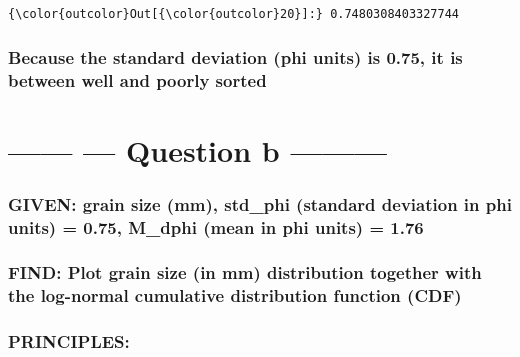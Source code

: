 \documentclass[11pt]{article}
\begin{document}
\begin{Verbatim}[commandchars=\\\{\}]
{\color{outcolor}Out[{\color{outcolor}20}]:} 0.7480308403327744
\end{Verbatim}
            
    \hypertarget{because-the-standard-deviation-phi-units-is-0.75-it-is-between-well-and-poorly-sorted}{%
\subsubsection{Because the standard deviation (phi units) is 0.75, it is
between well and poorly
sorted}\label{because-the-standard-deviation-phi-units-is-0.75-it-is-between-well-and-poorly-sorted}}

    \hypertarget{question-b}{%
\section{------ --- Question b ---------}\label{question-b}}

    \hypertarget{given-grain-size-mm-std_phi-standard-deviation-in-phi-units-0.75-m_dphi-mean-in-phi-units-1.76}{%
\subsubsection{\texorpdfstring{{\textbf{GIVEN:}} grain size (mm),
std\_phi (standard deviation in phi units) = 0.75, M\_dphi (mean in phi
units) =
1.76}{GIVEN: grain size (mm), std\_phi (standard deviation in phi units) = 0.75, M\_dphi (mean in phi units) = 1.76}}\label{given-grain-size-mm-std_phi-standard-deviation-in-phi-units-0.75-m_dphi-mean-in-phi-units-1.76}}

\hypertarget{find-plot-grain-size-in-mm-distribution-together-with-the-log-normal-cumulative-distribution-function-cdf}{%
\subsubsection{\texorpdfstring{{\textbf{FIND:}} Plot grain size (in mm)
distribution together with the log-normal cumulative distribution
function
(CDF)}{FIND: Plot grain size (in mm) distribution together with the log-normal cumulative distribution function (CDF)}}\label{find-plot-grain-size-in-mm-distribution-together-with-the-log-normal-cumulative-distribution-function-cdf}}

\hypertarget{principles}{%
\subsubsection{\texorpdfstring{{\textbf{PRINCIPLES:}}}{PRINCIPLES:}}\label{principles}}
\end{document}
